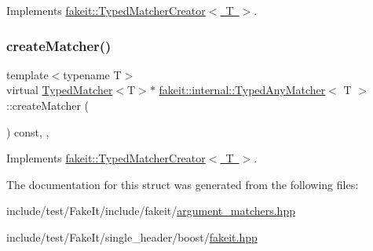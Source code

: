 Implements \mbox{\hyperlink{structfakeit_1_1TypedMatcherCreator_a40646cd11f8acf5c34b971f396891d5c}{fakeit\+::\+Typed\+Matcher\+Creator$<$ T $>$}}.

\mbox{\label{structfakeit_1_1internal_1_1TypedAnyMatcher_a4306295a5059d27896ccb3370275c4ce}} 
\subsubsection{\texorpdfstring{createMatcher()}{createMatcher()}\hspace{0.1cm}{\footnotesize\ttfamily [9/9]}}
{\footnotesize\ttfamily template$<$typename T$>$ \\
virtual \mbox{\hyperlink{structfakeit_1_1TypedMatcher}{Typed\+Matcher}}$<$T$>$$\ast$ \mbox{\hyperlink{structfakeit_1_1internal_1_1TypedAnyMatcher}{fakeit\+::internal\+::\+Typed\+Any\+Matcher}}$<$ T $>$\+::create\+Matcher (\begin{DoxyParamCaption}{ }\end{DoxyParamCaption}) const\hspace{0.3cm}{\ttfamily [inline]}, {\ttfamily [override]}, {\ttfamily [virtual]}}



Implements \mbox{\hyperlink{structfakeit_1_1TypedMatcherCreator_a40646cd11f8acf5c34b971f396891d5c}{fakeit\+::\+Typed\+Matcher\+Creator$<$ T $>$}}.



The documentation for this struct was generated from the following files\+:\begin{DoxyCompactItemize}
\item 
include/test/\+Fake\+It/include/fakeit/\mbox{\hyperlink{argument__matchers_8hpp}{argument\+\_\+matchers.\+hpp}}\item 
include/test/\+Fake\+It/single\+\_\+header/boost/\mbox{\hyperlink{single__header_2boost_2fakeit_8hpp}{fakeit.\+hpp}}\end{DoxyCompactItemize}
